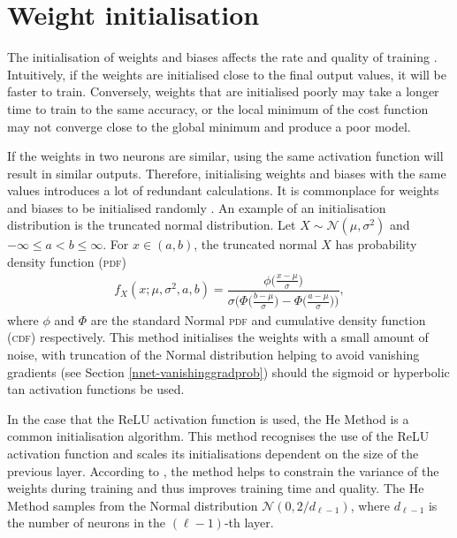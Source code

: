 
\section{Weight initialisation}

The initialisation of weights and biases affects the rate and quality of training \citep{Mishkin2016}. Intuitively, if the weights are initialised close to the final output values, it will be faster to train. Conversely, weights that are initialised poorly may take a longer time to train to the same accuracy, or the local minimum of the cost function may not converge close to the global minimum and produce a poor model.

If the weights in two neurons are similar, using the same activation function will result in similar outputs. Therefore, initialising weights and biases with the same values introduces a lot of redundant calculations. It is commonplace for weights and biases to be initialised randomly \citep{Nielson2015}. An example of an initialisation distribution is the truncated normal distribution. Let $X\sim\mathcal{N}(\mu,\sigma^2)$ and $-\infty \le a < b \le \infty$. For $x \in (a,b)$, the truncated normal $X$ has probability density function (\textsc{pdf})
\begin{align}
	f_X(x;\mu, \sigma^2,a,b) = \dfrac{\phi\big(\frac{x-\mu}{\sigma}\big)}{\sigma\bigg(\Phi\big(\frac{b-\mu}{\sigma}\big) - \Phi\big(\frac{a-\mu}{\sigma}\big)\bigg)},
\end{align}
where $\phi$ and $\Phi$ are the standard Normal \textsc{pdf} and cumulative density function (\textsc{cdf}) respectively. This method initialises the weights with a small amount of noise, with truncation of the Normal distribution helping to avoid vanishing gradients (see Section \ref{nnet-vanishinggradprob}) should the sigmoid or hyperbolic tan activation functions be used.

In the case that the ReLU activation function is used, the He Method \citep{HeKaiming2015DDiR} is a common initialisation algorithm. This method recognises the use of the ReLU activation function and scales its initialisations dependent on the size of the previous layer. According to \cite{HeKaiming2015DDiR}, the method helps to constrain the variance of the weights during training and thus improves training time and quality. The He Method samples from the Normal distribution $\mathcal{N}\left(0, 2/d_{\ell-1}\right)$, where $d_{\ell-1}$ is the number of neurons in the $(\ell-1)$-th layer.


